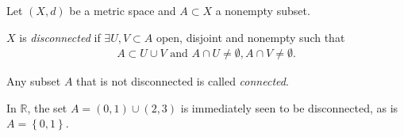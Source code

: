 \begin{definition}[Connectedness]\label{def:connectedness}
	Let $(X,d)$ be a metric space and $A \subset X$ a nonempty subset.

	$X$ is \textit{disconnected} if $\exists U, V \subset A$ open, disjoint and nonempty such that
	\begin{align*}
		A \subset U \cup V \text{ and } A \cap  U \neq \emptyset, A \cap V \neq \emptyset.
	\end{align*}

	Any subset $A$ that is not disconnected is called \textit{connected}.
\end{definition}

\begin{eg}
	In $\mathbb{R}$, the set $A = (0,1) \cup (2,3)$ is immediately seen to be disconnected, as is $A = \left\{ 0,1 \right\}$.
\end{eg}

